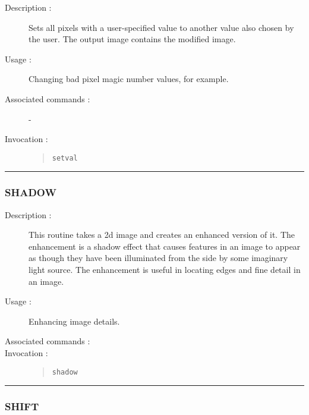 \begin{description}

\item[Description :] Sets all pixels with a user-specified value to
another value also chosen by the user.  The output image contains the
modified image.

\item[Usage :] Changing bad pixel magic number values, for example.
\item[Associated commands :] -
\item[Invocation :]

\begin{quote}{\tt  setval }\end{quote}

\end{description}

\hrule
\subsubsection*{\label{SHADOW}SHADOW}

\begin{description}

\item[Description :] This routine takes a 2d image and creates an
enhanced version of it. The enhancement is a shadow effect that causes
features in an image to appear as though they have been illuminated
from the side by some imaginary light source. The enhancement is useful
in locating edges and fine detail in an image.

\item[Usage :] Enhancing image details.
\item[Associated commands :] {\tt {}}
\item[Invocation :]

\begin{quote}{\tt  shadow }\end{quote}

\end{description}

\hrule
\subsubsection*{\label{SHIFT}SHIFT}

